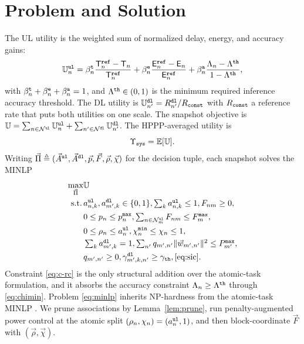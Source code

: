 \documentclass[journal]{IEEEtran}
\begin{document}
\section{Problem and Solution}
\label{sec:sol}
{The UL utility is the weighted sum of normalized delay, energy, and accuracy gains:}
\begin{equation}
\mathbb{U}_n^{\tt ul}
=\beta_n^{\tt t}\frac{\mathsf{T}_n^{\tt ref}-\mathsf{T}_n}{\mathsf{T}_n^{\tt ref}}
+\beta_n^{\tt e}\frac{\mathsf{E}_n^{\tt ref}-\mathsf{E}_n}{\mathsf{E}_n^{\tt ref}}
+\beta_n^{\tt a}\frac{\Lambda_n-\Lambda^{\tt th}}{1-\Lambda^{\tt th}},
\label{eq:Uul}
\end{equation}
with $\beta_n^{\tt t}+\beta_n^{\tt e}+\beta_n^{\tt a}=1$, and {$\Lambda^{\tt th} \in (0, 1)$ is the minimum required inference accuracy threshold.}
The DL utility is $\mathbb{U}_{n'}^{\tt dl}=R_{n'}^{\tt dl}/R_{\tt const}$ with $R_{\tt const}$ a reference rate that puts both utilities on one scale. The snapshot objective is $\mathbb{U}=\sum_{n\in\mathcal{N}^{\tt ul}}\mathbb{U}_n^{\tt ul}+\sum_{n'\in\mathcal{N}^{\tt dl}}\mathbb{U}_{n'}^{\tt dl}$. The HPPP-averaged utility is
\begin{equation}
\Upsilon_{\tt sys}
=\mathbb{E}[\mathbb{U}].
\label{eq:upsilon}
\end{equation}
Writing $\vec{\Pi}\triangleq(\vec{A}^{\tt ul},\vec{A}^{\tt dl},\vec{p},\vec{F},\vec{\rho},\vec{\chi})$ for the decision tuple, each snapshot solves the MINLP
\begin{subequations}\label{eq:minlp}
\begin{align}
\max_{\vec{\Pi}}&\mathbb{U}\\
\mathrm{s.t.}\,&a_{n,k}^{\tt ul},a_{m',k}^{\tt dl}\in\{0,1\},\textstyle\sum_k a_{n,k}^{\tt ul}\le1,F_{nm}\ge0,\label{eq:c-a}\\
&0\le p_n\le p_n^{\tt max},\textstyle\sum_{n\in\mathcal{N}_m^{\tt ul}}F_{nm}\le F_m^{\tt max},\label{eq:c-pf}\\
&0\le\rho_n\le a_n^{\tt ul},\chi_n^{\tt min}\le\chi_n\le1,\label{eq:c-rc}\\
&\textstyle\sum_k a_{m',k}^{\tt dl}=1,\textstyle\sum_{n'}q_{m',n'}\Vert\vec{w}_{m',n'}\Vert^2\le P_{m'}^{\tt max},\label{eq:c-dl}\\
&{q_{m',n'} \ge 0}, \gamma_{m',k,n'}^{\tt dl}\ge\gamma_{\tt th},\eqref{eq:sic}. \label{eq:c-sic}
\end{align}
\end{subequations}
Constraint \eqref{eq:c-rc} is the only structural addition over the atomic-task formulation, and it absorbs the accuracy constraint $\Lambda_n\ge\Lambda^{\tt th}$ through \eqref{eq:chimin}. Problem \eqref{eq:minlp} inherits NP-hardness from the atomic-task MINLP \cite{Hoang_TCOM_2024}. We prune associations by Lemma~\ref{lem:prune}, run penalty-augmented power control at the atomic split $(\rho_n,\chi_n)=(a_n^{\tt ul},1)$, and then block-coordinate $\vec{F}$ with $(\vec{\rho},\vec{\chi})$.
\end{document}
